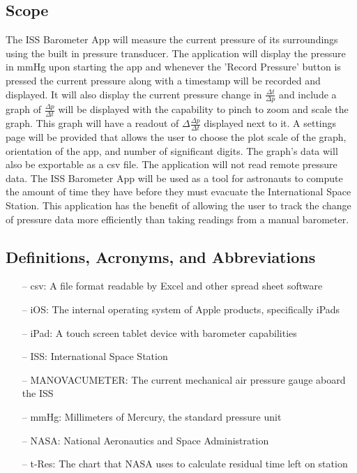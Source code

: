 \documentclass[onecolumn, draftclsnofoot,10pt, compsoc]{IEEEtran}
\def \CapstoneProjectName{ISS Barometer App }
\begin{document}
\subsection{Scope}
The \CapstoneProjectName will measure the current pressure of its surroundings using the built in pressure transducer.
The application will display the pressure in mmHg upon starting the app and whenever the 'Record Pressure' button is pressed the current pressure along with a timestamp will be recorded and displayed.
It will also display the current pressure change in $\frac{\Delta t}{\Delta p}$ and include a graph of $\frac{\Delta p}{\Delta t}$ will be displayed with the capability to pinch to zoom and scale the graph.
This graph will have a readout of $\Delta \frac{\Delta p}{\Delta t}$ displayed next to it.\textbf{}
A settings page will be provided that allows the user to choose the plot scale of the graph, orientation of the app, and number of significant digits.
The graph's data will also be exportable as a csv file.
The application will not read remote pressure data.
The \CapstoneProjectName will be used as a tool for astronauts to compute the amount of time they have before they must evacuate the International Space Station.
This application has the benefit of allowing the user to track the change of pressure data more efficiently than taking readings from a manual barometer.

\subsection{Definitions, Acronyms, and Abbreviations}
\begin{itemize}
\item[--] csv: A file format readable by Excel and other spread sheet software
\item[--] iOS: The internal operating system of Apple products, specifically iPads
\item[--] iPad: A touch screen tablet device with barometer capabilities
\item[--] ISS: International Space Station
\item[--] MANOVACUMETER: The current mechanical air pressure gauge aboard the ISS
\item[--] mmHg: Millimeters of Mercury, the standard pressure unit
\item[--] NASA: National Aeronautics and Space Administration
\item[--] t-Res: The chart that NASA uses to calculate residual time left on station
\end{itemize}
\end{document}
